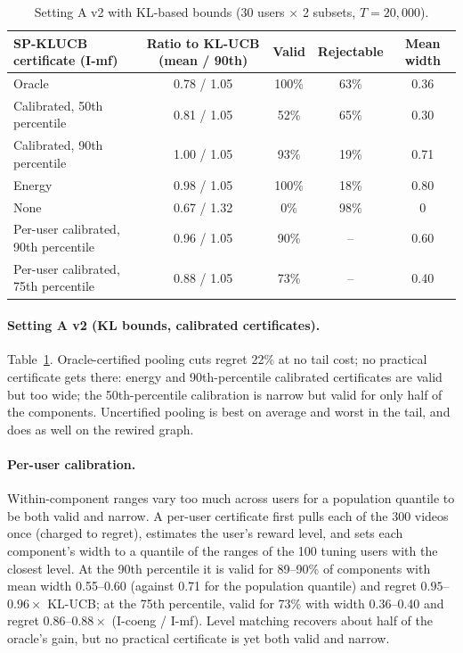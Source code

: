 \documentclass[11pt]{article}
\theoremstyle{definition}
\theoremstyle{remark}
\begin{document}
\begin{table}[t]\centering\small
\begin{tabular}{lcccc}
\toprule
SP-KLUCB certificate (I-mf) & Ratio to KL-UCB (mean / 90th) & Valid & Rejectable & Mean width \\
\midrule
Oracle & 0.78 / 1.05 & 100\% & 63\% & 0.36 \\
Calibrated, 50th percentile & 0.81 / 1.05 & 52\% & 65\% & 0.30 \\
Calibrated, 90th percentile & 1.00 / 1.05 & 93\% & 19\% & 0.71 \\
Energy & 0.98 / 1.05 & 100\% & 18\% & 0.80 \\
None & 0.67 / 1.32 & 0\% & 98\% & 0 \\
\midrule
Per-user calibrated, 90th percentile & 0.96 / 1.05 & 90\% & -- & 0.60 \\
Per-user calibrated, 75th percentile & 0.88 / 1.05 & 73\% & -- & 0.40 \\
\bottomrule
\end{tabular}
\caption{Setting A v2 with KL-based bounds (30 users $\times$ 2 subsets, $T=20{,}000$).}\label{tab:a2}
\end{table}

\paragraph{Setting A v2 (KL bounds, calibrated certificates).} Table~\ref{tab:a2}. Oracle-certified pooling cuts regret 22\% at no tail cost; no practical certificate gets there: energy and 90th-percentile calibrated certificates are valid but too wide; the 50th-percentile calibration is narrow but valid for only half of the components. Uncertified pooling is best on average and worst in the tail, and does as well on the rewired graph.

\paragraph{Per-user calibration.}\label{sec:usercal} Within-component ranges vary too much across users for a population quantile to be both valid and narrow. A per-user certificate first pulls each of the 300 videos once (charged to regret), estimates the user's reward level, and sets each component's width to a quantile of the ranges of the 100 tuning users with the closest level. At the 90th percentile it is valid for 89--90\% of components with mean width 0.55--0.60 (against 0.71 for the population quantile) and regret $0.95$--$0.96\times$ KL-UCB; at the 75th percentile, valid for 73\% with width 0.36--0.40 and regret $0.86$--$0.88\times$ (I-coeng / I-mf). Level matching recovers about half of the oracle's gain, but no practical certificate is yet both valid and narrow.
\end{document}
